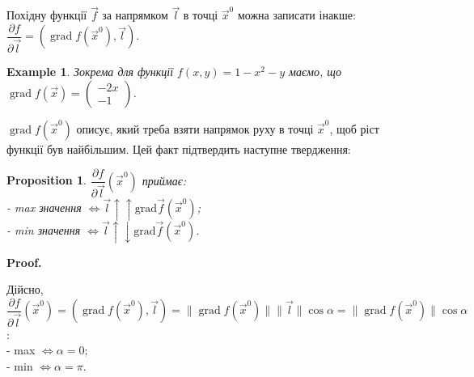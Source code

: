 \documentclass[a4paper, 10pt]{article}
\makeatletter
\DeclareMathOperator{\wordgrad}{grad}
\def\departial#1#2{\dfrac{\partial {#1}}{\partial {#2}}}
\def\qed{$\blacksquare$}
\theoremstyle{theoremdd}
\theoremstyle{theoremdd}
\theoremstyle{theoremdd}
\theoremstyle{theoremdd}
\theoremstyle{theoremdd}
\newtheorem{example}[theorem]{Example}
\theoremstyle{theoremdd}
\newtheorem{proposition}[theorem]{Proposition}
\theoremstyle{theoremdd}
\theoremstyle{theoremdd}
\theoremstyle{theoremdd}
\renewenvironment{proof}[1][Proof.\\]{\par
\pushQED{\hfill \qed}%
\normalfont \topsep6\p@\@plus6\p@\relax
\trivlist
\item\relax
{\bfseries
#1\@addpunct{.}}\hspace\labelsep\ignorespaces
}{%
\popQED\endtrivlist\@endpefalse
}
\newcommand\Norm[1]{\|#1\|}
\makeatother
\begin{document}
Похідну функції $\vec{f}$ за напрямком $\vec{l}$ в точці $\vec{x}^0$ можна записати інакше: $\departial{f}{\vec{l}} = \left( \wordgrad f(\vec{x}^0), \vec{l} \right)$.

\begin{example}
Зокрема для функції $f(x,y) = 1-x^2-y$ маємо, що $\wordgrad f(\vec{x}) = \begin{pmatrix}
-2x \\ -1
\end{pmatrix}$.
\end{example}

$\wordgrad f(\vec{x}^0)$ описує, який треба взяти напрямок руху в точці $\vec{x}^0$, щоб ріст функції був найбільшим. Цей факт підтвердить наступне твердження:

\begin{proposition}
$\dfrac{\partial f}{\partial \vec{l}}(\vec{x}^0)$ приймає:\\
- max значення $ \iff \vec{l} \uparrow \uparrow \textrm{grad} \vec{f}(\vec{x}^0)$;\\
- min значення $ \iff \vec{l} \uparrow \downarrow \textrm{grad} \vec{f}(\vec{x}^0)$.
\end{proposition}

\begin{proof}
Дійсно, $\departial{f}{\vec{l}}(\vec{x}^0) = \left( \wordgrad f(\vec{x}^0), \vec{l} \right) = \Norm{\wordgrad f(\vec{x}^0)} \Norm{\vec{l}} \cos \alpha = \Norm{\wordgrad f(\vec{x}^0)} \cos \alpha$:\\
- max $\iff \alpha = 0$;\\
- min $\iff \alpha = \pi$.
\end{proof}
\end{document}
